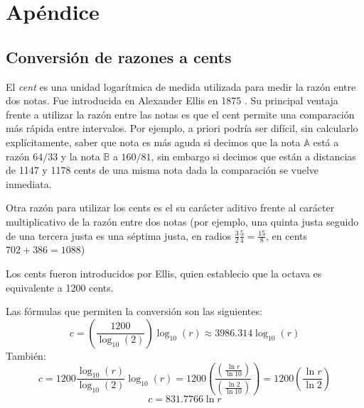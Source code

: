 \documentclass[11pt,a4paper]{article}
\begin{document}
	
	
	
	
	
	
	\newpage
	


\appendix

\section{Apéndice}

\subsection{Conversión de razones a cents}	
	
El \emph{cent} es una unidad logarítmica de medida utilizada para medir la razón entre dos notas. Fue introducida en Alexander Ellis en 1875 \cite{Bens}. Su principal ventaja frente a utilizar la razón entre las notas es que el cent permite una comparación más rápida entre intervalos. Por ejemplo, a priori podría ser difícil, sin calcularlo explícitamente, saber que nota es más aguda si decimos que la nota $\mathbb{A}$ está a razón $64 / 33$ y la nota $\mathbb{B}$ a $160 / 81$, sin embargo si decimos que están a distancias de 1147 y 1178 cents de una misma nota dada la comparación se vuelve inmediata. 

Otra razón para utilizar los cents es el su carácter aditivo frente al carácter multiplicativo de la razón entre dos notas (por ejemplo, una quinta justa seguido de una tercera justa es una séptima justa, en radios $ \frac{3}{2} \frac{5}{4} = \frac{15}{8} $, en cents $702 + 386 = 1088$)

Los cents fueron introducidos por Ellis, quien establecio que la octava es equivalente a 1200 cents.

Las fórmulas que permiten la conversión son las siguientes:
$$
 c = \left( \frac{1200}{\log_{10} (2)} \right) \log_{10} (r) \approx 3986.314 \log_{10} (r)  
$$
    También:
$$
   c = 1200 \frac{\log_{10} (r)}{\log_{10} (2)} \log_{10} (r) = 1200 \left( \frac{ ( \frac{\ln r}{\ln 10} ) }{( \frac{\ln 2}{\ln 10} ) } \right) = 1200 \left( \frac{\ln r}{\ln 2} \right)
$$
$$
    \boxed{c = 831.7766 \ln r}
$$
\end{document}
